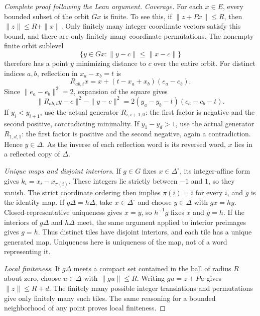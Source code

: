 \begin{proof}[Complete proof following the Lean argument]
\emph{Coverage.}
For each \(x\in E\), every bounded subset of the orbit \(Gx\) is finite.
To see this, if \(\|z+P x\|\le R\), then
\(\|z\|\le R+\|x\|\). Only finitely many integer coordinate vectors satisfy
this bound, and there are only finitely many coordinate permutations.
The nonempty finite orbit sublevel
\[
             \{y\in Gx:\|y-c\|\le\|x-c\|\}
\]
therefore has a point \(y\) minimizing distance to \(c\) over the entire
orbit.
For distinct indices \(a,b\), reflection in \(x_a-x_b=t\) is
\[
 R_{ab,t}x=x+(t-x_a+x_b)(e_a-e_b).
\]
Since \(\|e_a-e_b\|^2=2\), expansion of the square gives
\[
 \|R_{ab,t}y-c\|^2-\|y-c\|^2
       =2(y_a-y_b-t)(c_a-c_b-t).
\]
If \(y_i<y_{i+1}\), use the actual generator \(R_{i,i+1,0}\):
the first factor is negative and the second positive, contradicting
minimality. If \(y_1-y_d>1\), use the actual generator \(R_{1,d,1}\):
the first factor is positive and the second negative, again a contradiction.
Hence \(y\in\Delta\). As the inverse of each reflection word is its reversed
word, \(x\) lies in a reflected copy of \(\Delta\).

\emph{Unique maps and disjoint interiors.}
If \(g\in G\) fixes \(x\in\Delta^\circ\), its integer-affine form gives
\(k_i=x_i-x_{\pi(i)}\). These integers lie strictly between \(-1\) and \(1\),
so they vanish. The strict coordinate ordering then implies \(\pi(i)=i\)
for every \(i\), and \(g\) is the identity map.
If \(g\Delta=h\Delta\), take \(x\in\Delta^\circ\) and choose
\(y\in\Delta\) with \(g x=h y\). Closed-representative uniqueness gives
\(x=y\), so \(h^{-1}g\) fixes \(x\) and \(g=h\).
If the interiors of \(g\Delta\) and \(h\Delta\) meet, the same argument
applied to interior preimages gives \(g=h\).
Thus distinct tiles have disjoint interiors, and each tile has a unique
generated map. Uniqueness here is uniqueness of the map, not of a word
representing it.

\emph{Local finiteness.}
If \(g\Delta\) meets a compact set contained in the ball of radius \(R\)
about zero, choose \(u\in\Delta\) with \(\|g u\|\le R\). Writing
\(g u=z+P u\) gives \(\|z\|\le R+d\).
The finitely many possible integer translations and permutations give
only finitely many such tiles. The same reasoning for a bounded
neighborhood of any point proves local finiteness.


\end{proof}
